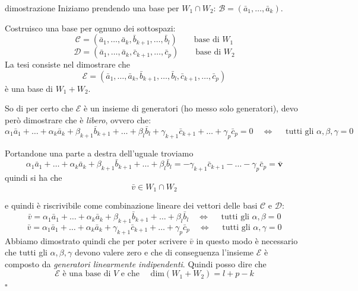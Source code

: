 \documentclass[x11names]{article}
\newcommand*{\QEDB}{\null\nobreak\hfill\ensuremath{\square}}%
\begin{document}
\begin{es}{dimostrazione}
	Iniziamo prendendo una base per $W_{1} \cap W_{2}$: $\mathcal{B} = \left(\bar{a}_{1},\dots,\bar{a}_{k}\right)$.
	
	Costruisco una base per ognuno dei sottospazi:
	\[
	\mathcal{C} = \left(\bar{a}_{1},\dots,\bar{a}_{k},\bar{b}_{k+1},\dots,\bar{b}_{l}\right) \qquad \text{base di } W_{1}
	\]
	\[
	\mathcal{D} = \left(\bar{a}_{1},\dots,\bar{a}_{k},\bar{c}_{k+1},\dots,\bar{c}_{p}\right) \qquad \text{base di } W_{2}
	\]
	La tesi consiste nel dimostrare che 
	\[
	\mathcal{E} = \left(\bar{a}_{1},\dots,\bar{a}_{k},\bar{b}_{k+1},\dots,\bar{b}_{l},\bar{c}_{k+1},\dots,\bar{c}_{p}\right)
	\]
	è una base di $W_{1} + W_{2}$.
	
	So di per certo che $\mathcal{E}$ è un insieme di generatori (ho messo solo generatori), devo però dimostrare che è \textit{libero}, ovvero che:
	\[
		\alpha_{1} \bar{a}_{1} + \dots + \alpha_{k} \bar{a}_{k} + \beta_{k+1} \bar{b}_{k+1} + \dots + \beta_{l} \bar{b}_{l} + \gamma_{k+1} \bar{c}_{k+1} + \dots + \gamma_{p} \bar{c}_{p} = 0 \quad \Longleftrightarrow \quad \text{ tutti gli }\alpha, \beta, \gamma = 0
	\]
	
	Portandone una parte a destra dell'uguale troviamo
	\[
	\alpha_{1} \bar{a}_{1} + \dots + \alpha_{k} \bar{a}_{k} + \beta_{k+1} \bar{b}_{k+1} + \dots + \beta_{l} \bar{b}_{l}  = -\gamma_{k+1} \bar{c}_{k+1} - \dots - \gamma_{p} \bar{c}_{p}  \mathbf{= \bar{v}} 
	\]
	quindi si ha che 
	\[
	\bar{v} \in W_{1} \cap W_{2}
	\]
\end{es}
\begin{es}{}
	e quindi è riscrivibile come combinazione lineare dei vettori delle basi $\mathcal{C}$ e $\mathcal{D}$:
	\[
	\bar{v} = 	\alpha_{1} \bar{a}_{1} + \dots + \alpha_{k} \bar{a}_{k} + \beta_{k+1} \bar{b}_{k+1} + \dots + \beta_{l} \bar{b}_{l}\quad \Longleftrightarrow \quad \text{ tutti gli }\alpha, \beta = 0
	\]
	\[
	\bar{v} = 	\alpha_{1} \bar{a}_{1} + \dots + \alpha_{k} \bar{a}_{k} + \gamma_{k+1} \bar{c}_{k+1} + \dots + \gamma_{p} \bar{c}_{p}\quad \Longleftrightarrow \quad \text{ tutti gli }\alpha, \gamma = 0
	\]
	Abbiamo dimostrato quindi che per poter scrivere $\bar{v}$ in questo modo è necessario che tutti gli $\alpha,\beta,\gamma$ devono valere zero e che di conseguenza l'insieme $\mathcal{E}$ è composto da \textit{generatori linearmente indipendenti}. Quindi posso dire che 
	\[
	\mathcal{E} \text{ è una base di } V \text{ e che } \quad \text{dim}(W_{1} + W_{2}) = l + p - k
	\]
	 \QEDB
\end{es}
\end{document}
